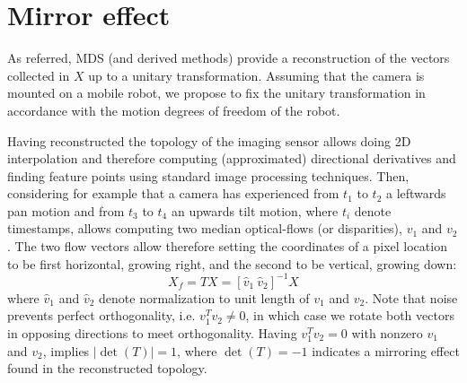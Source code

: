 \section{Mirror effect}

As referred, MDS (and derived methods) provide a reconstruction of the vectors collected in $X$ up to a unitary transformation. Assuming that the camera is mounted on a mobile robot, we propose to fix the unitary transformation in accordance with the motion degrees of freedom of the robot.

Having reconstructed the topology of the imaging sensor allows doing 2D interpolation and therefore computing (approximated) directional derivatives and finding feature points using standard image processing techniques.
%
Then, considering for example that a camera has experienced from $t_1$ to $t_2$ a leftwards pan motion and from $t_3$ to $t_4$ an upwards tilt motion, where $t_i$ denote timestamps, allows computing two median optical-flows (or disparities), $v_1$ and $v_2$. The two flow vectors allow therefore setting the coordinates of a pixel location to be first horizontal, growing right, and the second to be vertical, growing down:
%
\begin{equation}
X_f= T X = [\hat v_1 \ \hat v_2]^{-1} X
\label{eq:rot_mirror}
\end{equation}
%
where $\hat v_1$ and $\hat v_2$ denote normalization to unit length of $v_1$ and $v_2$. Note that noise prevents perfect orthogonality, i.e. $v_1^T v_2 \ne 0$, in which case we rotate both vectors in opposing directions to meet orthogonality. Having $v_1^T v_2 = 0$ with nonzero $v_1$ and $v_2$, implies $|\det(T)| = 1$, where $\det(T)=-1$ indicates a mirroring effect found in the reconstructed topology.


